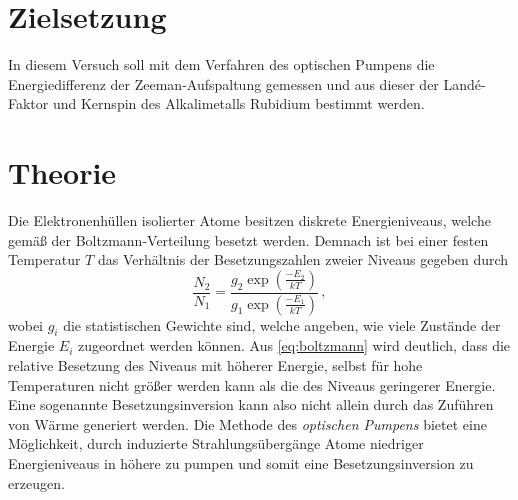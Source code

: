 



\maketitle

\section{Zielsetzung}
In diesem Versuch soll mit dem Verfahren des optischen Pumpens die Energiedifferenz der Zeeman-Aufspaltung gemessen und aus dieser der Landé-Faktor und Kernspin des Alkalimetalls Rubidium bestimmt werden.


\section{Theorie}
Die Elektronenhüllen isolierter Atome besitzen diskrete Energieniveaus, welche gemäß der Boltzmann-Verteilung besetzt werden.
Demnach ist bei einer festen Temperatur $T$ das Verhältnis der Besetzungszahlen zweier Niveaus gegeben durch
\begin{equation}\label{eq:boltzmann}
\frac{N_2}{N_1} = \frac{g_2 \exp\left(\frac{-E_2}{kT}\right)}{g_1 \exp\left(\frac{-E_1}{kT}\right)}\, ,
\end{equation}
wobei $g_i$ die statistischen Gewichte sind, welche angeben, wie viele Zustände der Energie $E_i$ zugeordnet werden können.
Aus \eqref{eq:boltzmann} wird deutlich, dass die relative Besetzung des Niveaus mit höherer Energie, selbst für hohe Temperaturen nicht größer werden kann als die des Niveaus geringerer Energie.
Eine sogenannte Besetzungsinversion kann also nicht allein durch das Zuführen von Wärme generiert werden.
Die Methode des \textit{optischen Pumpens} bietet eine Möglichkeit, durch induzierte Strahlungsübergänge Atome niedriger Energieniveaus in höhere zu pumpen und somit eine Besetzungsinversion zu erzeugen.

